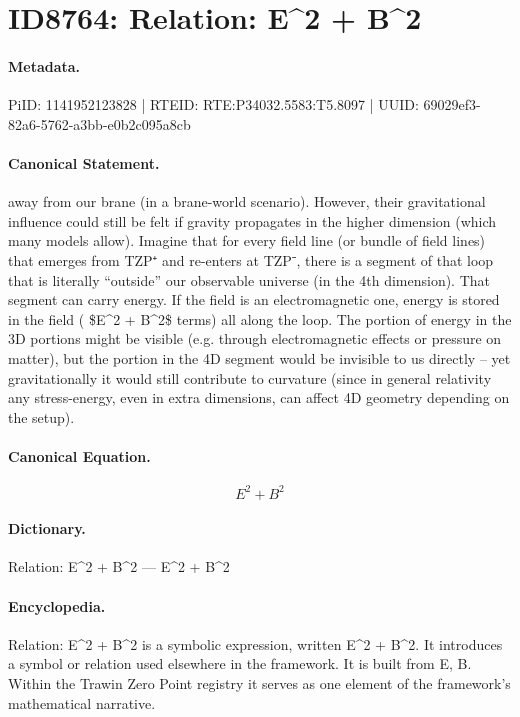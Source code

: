 \section*{ID8764: Relation: E\textasciicircum{}2 + B\textasciicircum{}2}
\paragraph{Metadata.}
PiID: 1141952123828 | RTEID: RTE:P34032.5583:T5.8097 | UUID: 69029ef3-82a6-5762-a3bb-e0b2c095a8cb

\paragraph{Canonical Statement.}
away from our brane (in a brane-world scenario). However, their gravitational influence could still be felt if gravity propagates in the higher dimension (which many models allow). Imagine that for every field line (or bundle of field lines) that emerges from TZP⁺ and re-enters at TZP⁻, there is a segment of that loop that is literally “outside” our observable universe (in the 4th dimension). That segment can carry energy. If the field is an electromagnetic one, energy is stored in the field ( \$E\textasciicircum{}2 + B\textasciicircum{}2\$ terms) all along the loop. The portion of energy in the 3D portions might be visible (e.g. through electromagnetic effects or pressure on matter), but the portion in the 4D segment would be invisible to us directly – yet gravitationally it would still contribute to curvature (since in general relativity any stress-energy, even in extra dimensions, can affect 4D geometry depending on the setup).

\paragraph{Canonical Equation.}
\[
E^2 + B^2
\]

\paragraph{Dictionary.}
Relation: E\textasciicircum{}2 + B\textasciicircum{}2 — E\textasciicircum{}2 + B\textasciicircum{}2

\paragraph{Encyclopedia.}
Relation: E\textasciicircum{}2 + B\textasciicircum{}2 is a symbolic expression, written E\textasciicircum{}2 + B\textasciicircum{}2. It introduces a symbol or relation used elsewhere in the framework. It is built from E, B. Within the Trawin Zero Point registry it serves as one element of the framework's mathematical narrative.
